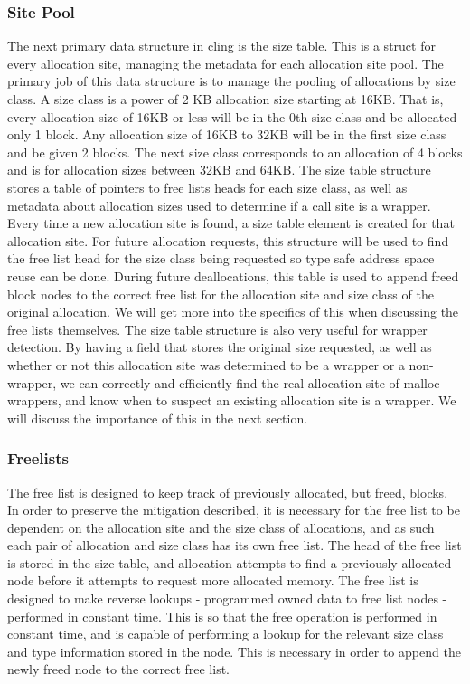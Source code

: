 \documentclass[conference]{IEEEtran}
\begin{document}
\subsubsection{Site Pool}
The next primary data structure in cling is the size table. This is a struct for 
every allocation site, managing the metadata for each allocation site pool. The 
primary job of this data structure is to manage the pooling of allocations by 
size class. A size class is a power of 2 KB allocation size starting at 16KB. 
That is, every allocation size of 16KB or less will be in the 0th size class 
and be allocated only 1 block. Any allocation size of 16KB to 32KB will be in 
the first size class and be given 2 blocks. The next size class corresponds 
to an allocation of 4 blocks and is for allocation sizes between 32KB and 64KB. 
The size table structure stores a table of pointers to free lists heads for each 
size class, as well as metadata about allocation sizes used to determine if a 
call site is a wrapper. Every time a new allocation site is found, a size table 
element is created for that allocation site. For future allocation requests, this 
structure will be used to find the free list head for the size class being 
requested so type safe address space reuse can be done. During future deallocations, 
this table is used to append freed block nodes to the correct free list for the 
allocation site and size class of the original allocation. We will get more into 
the specifics of this when discussing the free lists themselves. The size table 
structure is also very useful for wrapper detection. By having a field that 
stores the original size requested, as well as whether or not this allocation site 
was determined to be a wrapper or a non-wrapper, we can correctly and efficiently 
find the real allocation site of malloc wrappers, and know when to suspect an 
existing allocation site is a wrapper. We will discuss the importance of this in 
the next section.

\subsubsection{Freelists}
The free list is designed to keep track of previously allocated, but freed, blocks. 
In order to preserve the mitigation described, it is necessary for the free list 
to be dependent on the allocation site and the size class of allocations, and as 
such each pair of allocation and size class has its own free list. The head of 
the free list is stored in the size table, and allocation attempts to find a 
previously allocated node before it attempts to request more allocated memory. The 
free list is designed to make reverse lookups - programmed owned data to free list 
nodes - performed in constant time. This is so that the free operation is performed 
in constant time, and is capable of performing a lookup for the relevant size class 
and type information stored in the node. This is necessary in order to append the 
newly freed node to the correct free list.
\end{document}
